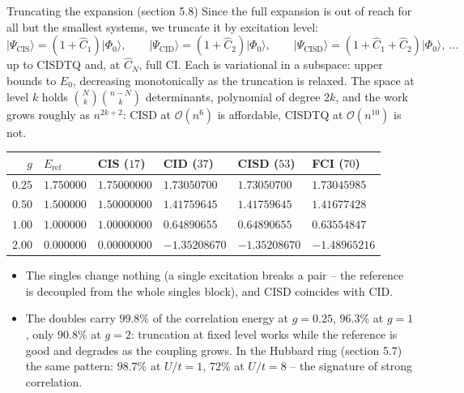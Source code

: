 \documentclass[aspectratio=169,10pt]{beamer}
\newcommand{\ket}[1]{\vert #1\rangle}
\begin{document}
\begin{frame}{Truncating the expansion (section 5.8)}
  \footnotesize
  Since the full expansion is out of reach for all but the smallest systems, we truncate it by excitation level:
  \[
    \ket{\Psi_{\mathrm{CIS}}}=(1+\hat{C}_1)\ket{\Phi_0},\qquad
    \ket{\Psi_{\mathrm{CID}}}=(1+\hat{C}_2)\ket{\Phi_0},\qquad
    \ket{\Psi_{\mathrm{CISD}}}=(1+\hat{C}_1+\hat{C}_2)\ket{\Phi_0},\ \dots
  \]
  up to CISDTQ and, at $\hat{C}_N$, full CI. Each is variational in a subspace: upper bounds to $E_0$, decreasing monotonically as the truncation is relaxed. The space at level $k$ holds $\binom{N}{k}\binom{n-N}{k}$ determinants, polynomial of degree $2k$, and the work grows roughly as $n^{2k+2}$: CISD at $\mathcal{O}(n^6)$ is affordable, CISDTQ at $\mathcal{O}(n^{10})$ is not.
  \begin{center}
  \renewcommand{\arraystretch}{1.15}
  \begin{tabular}{rlllll}
    \toprule
    $g$ & $E_{\mathrm{ref}}$ & CIS ($17$) & CID ($37$) & CISD ($53$) & FCI ($70$)\\
    \midrule
    $0.25$ & $1.750000$ & $1.75000000$ & $1.73050700$ & $1.73050700$ & $1.73045985$\\
    $0.50$ & $1.500000$ & $1.50000000$ & $1.41759645$ & $1.41759645$ & $1.41677428$\\
    $1.00$ & $1.000000$ & $1.00000000$ & $0.64890655$ & $0.64890655$ & $0.63554847$\\
    $2.00$ & $0.000000$ & $0.00000000$ & $-1.35208670$ & $-1.35208670$ & $-1.48965216$\\
    \bottomrule
  \end{tabular}
  \end{center}
  \begin{itemize}
    \item The singles change nothing (a single excitation breaks a pair -- the reference is decoupled from the whole singles block), and CISD coincides with CID.
    \item The doubles carry $99.8\%$ of the correlation energy at $g=0.25$, $96.3\%$ at $g=1$, only $90.8\%$ at $g=2$: truncation at fixed level works while the reference is good and degrades as the coupling grows. In the Hubbard ring (section 5.7) the same pattern: $98.7\%$ at $U/t=1$, $72\%$ at $U/t=8$ -- the signature of \alert{strong correlation}.
  \end{itemize}
\end{frame}
\end{document}

